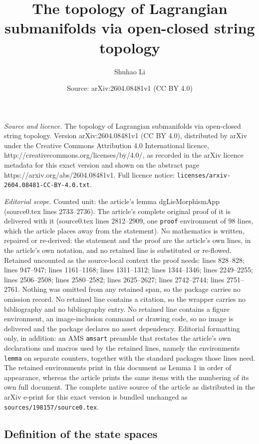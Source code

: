 \documentclass[10pt,a4paper]{amsart}
\title{The topology of Lagrangian submanifolds via open-closed string topology}
\author{Shuhao Li}
\date{Source: arXiv:2604.08481v1 (CC BY 4.0)}
\begin{document}
\maketitle

\noindent\emph{Source and licence.} The topology of Lagrangian submanifolds via open-closed string topology. Version arXiv:2604.08481v1 (CC BY 4.0), distributed by arXiv under the Creative Commons Attribution 4.0 International licence, http://creativecommons.org/licenses/by/4.0/, as recorded in the arXiv licence metadata for this exact version and shown on the abstract page https://arxiv.org/abs/2604.08481v1. Full licence notice: \texttt{licenses/arxiv-2604.08481-CC-BY-4.0.txt}.\par\smallskip

\noindent\textit{Editorial scope.} Counted unit: the article's lemma dgLieMorphismApp (source0.tex lines 2733--2736). The article's complete original proof of it is delivered with it (source0.tex lines 2812--2909, one \texttt{proof} environment of 98 lines, which the article places away from the statement). No mathematics is written, repaired or re-derived: the statement and the proof are the article's own lines, in the article's own notation, and no retained line is substituted or re-flowed.  Retained uncounted as the source-local context the proof needs: lines 828--828; lines 947--947; lines 1161--1168; lines 1311--1312; lines 1344--1346; lines 2249--2255; lines 2506--2508; lines 2580--2582; lines 2625--2627; lines 2742--2744; lines 2751--2761.  Nothing was omitted from any retained span, so the package carries no omission record.  No retained line contains a citation, so the wrapper carries no bibliography and no bibliography entry.  No retained line contains a figure environment, an image-inclusion command or drawing code, so no image is delivered and the package declares no asset dependency.  Editorial formatting only, in addition: an AMS \texttt{amsart} preamble that restates the article's own declarations and macros used by the retained lines, namely the environments \texttt{lemma} on separate counters, together with the standard packages those lines need.  The retained environments print in this document as Lemma 1 in order of appearance, whereas the article prints the same items with the numbering of its own full document.  The complete native source of the article as distributed in the arXiv e-print for this exact version is bundled unchanged as \texttt{sources/198157/source0.tex}.
\subsection{Definition of the state spaces}\label{Subsc: StateSpace}
\end{document}
